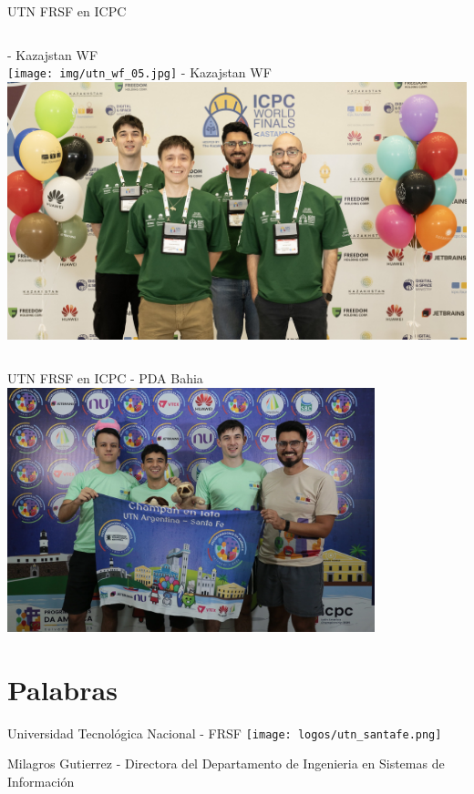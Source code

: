 \documentclass{beamer}
\begin{document}
\begin{frame}{UTN FRSF en ICPC}
    \begin{columns}[t]
         - Kazajstan WF\\
        \texttt{[image: img/utn\_wf\_05.jpg]}
         - Kazajstan WF\\
        \includegraphics[width=1\textwidth]{img/utn_wf_06.jpg}
    \end{columns}
\end{frame}

\begin{frame}{UTN FRSF en ICPC}
     - PDA Bahia\\
    \includegraphics[width=0.8\textwidth]{img/utn_pda_02.png}
\end{frame}

\section{Palabras}

\begin{frame}{Universidad Tecnológica Nacional - FRSF}
    \centering
    \texttt{[image: logos/utn\_santafe.png]}
    
    \vspace{0.5cm}
    
    Milagros Gutierrez - Directora del Departamento de Ingenieria en Sistemas de Información
\end{frame}
\end{document}
